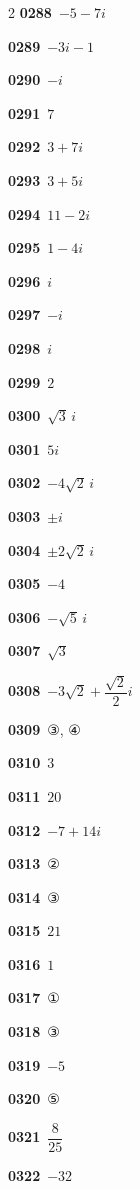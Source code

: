 \documentclass[10pt,a4paper]{article}
\begin{document}
\begin{multicols}{2}
\noindent\textbf{0288}\ $-5-7i$\par
\noindent\textbf{0289}\ $-3i-1$\par
\noindent\textbf{0290}\ $-i$\par
\noindent\textbf{0291}\ $7$\par
\noindent\textbf{0292}\ $3+7i$\par
\noindent\textbf{0293}\ $3+5i$\par
\noindent\textbf{0294}\ $11-2i$\par
\noindent\textbf{0295}\ $1-4i$\par
\noindent\textbf{0296}\ $i$\par
\noindent\textbf{0297}\ $-i$\par
\noindent\textbf{0298}\ $i$\par
\noindent\textbf{0299}\ $2$\par
\noindent\textbf{0300}\ $\sqrt{3}\,i$\par
\noindent\textbf{0301}\ $5i$\par
\noindent\textbf{0302}\ $-4\sqrt{2}\,i$\par
\noindent\textbf{0303}\ $\pm i$\par
\noindent\textbf{0304}\ $\pm 2\sqrt{2}\,i$\par
\noindent\textbf{0305}\ $-4$\par
\noindent\textbf{0306}\ $-\sqrt{5}\,i$\par
\noindent\textbf{0307}\ $\sqrt{3}$\par
\noindent\textbf{0308}\ $-3\sqrt{2}+\dfrac{\sqrt{2}}{2}i$\par
\noindent\textbf{0309}\ ③, ④\par
\noindent\textbf{0310}\ $3$\par
\noindent\textbf{0311}\ $20$\par
\noindent\textbf{0312}\ $-7+14i$\par
\noindent\textbf{0313}\ ②\par
\noindent\textbf{0314}\ ③\par
\noindent\textbf{0315}\ $21$\par
\noindent\textbf{0316}\ $1$\par
\noindent\textbf{0317}\ ①\par
\noindent\textbf{0318}\ ③\par
\noindent\textbf{0319}\ $-5$\par
\noindent\textbf{0320}\ ⑤\par
\noindent\textbf{0321}\ $\dfrac{8}{25}$\par
\noindent\textbf{0322}\ $-32$\par

\end{multicols}
\end{document}
